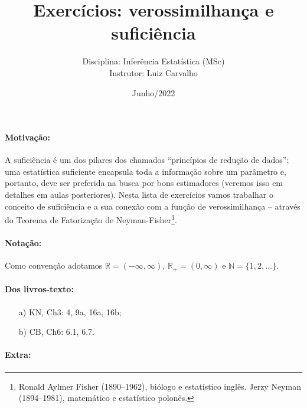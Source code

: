 \documentclass[a4paper,10pt, notitlepage]{report}
\title{Exercícios: verossimilhança e suficiência}
\author{Disciplina: Inferência Estatística (MSc) \\ Instrutor: Luiz Carvalho}
\date{Junho/2022}
\newcommand{\rpl}{\mathbb{R}_+}
\begin{document}
\maketitle

\paragraph{Motivação:}
A suficiência é um dos pilares dos chamados ``princípios de redução de dados''; uma estatística suficiente encapsula toda a informação sobre um parâmetro e, portanto, deve ser preferida na busca por bons estimadores (veremos isso em detalhes em aulas posteriores).
Nesta lista de exercícios vamos trabalhar o conceito de suficiência e a sua conexão com a função de verossimilhança -- através do Teorema de Fatorização de Neyman-Fisher\footnote{Ronald Aylmer Fisher (1890--1962), biólogo e estatístico inglês. Jerzy Neyman (1894--1981), matemático e estatístico polonês.}.

\paragraph{Notação:} Como convenção adotamos $\mathbb{R} = (-\infty, \infty)$, $\rpl = (0, \infty)$ e $\mathbb{N} = \{1, 2, \ldots \}$.

\paragraph{Dos livros-texto:}

\begin{itemize}
    \item[a)] KN, Ch3: 4, 9a, 16a, 16b;
    \item[b)] CB, Ch6: 6.1, 6.7.
\end{itemize}


\paragraph{Extra:}
\end{document}

